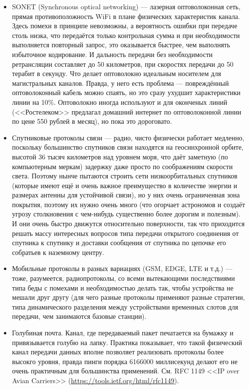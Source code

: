\documentclass[a5paper]{article}
\begin{document}
\begin{itemize}
    \item SONET (Synchronous optical networking) --- лазерная оптоволоконная сеть, прямая противоположность WiFi в плане физических характеристик канала. Здесь помехи в принципе невозможны, а вероятность ошибки при передаче столь низка, что передаётся только контрольная сумма и при необходимости выполняется повторный запрос, это оказывается быстрее, чем выполнять избыточное кодирование. И дальность передачи без необходимости ретрансляции составляет до 50 километров, при скоростях передачи до 50 терабит в секунду. Что делает оптоволокно идеальным носителем для магистральных каналов. Правда, у него есть проблема --- повреждённый оптоволоконный кабель можно спаять, но это сразу ухудшит характеристики линии на 10\%. Оптоволокно иногда используют и для оконченых линий (<<Ростелеком>> предлагал домашний интернет по оптоволоконной линии по цене 550 рублей в месяц), но пока это дороговато.
    \item Спутниковые протоколы связи --- радио, чисто физически работает медленно, поскольку большинство спутников связи находятся на геосинхронной орбите, высотой 36 тысяч километров над уровнем моря, что даёт заметную (по компьютерным меркам) задержку даже просто по соображениям скорости света. Поэтому нынче пытаются строить сети низкоорбитальных спутников (которые имеют ещё и очень важное преимущество в количестве энергии и размерах антенны для устойчивой связи), но у них очень ограниченная зона покрытия, поэтому их нужно очень много (что огорчает астрономов и создаёт угрозу столкновения с чем-нибудь существенно более дорогим и полезным). И они очень быстро движутся относительно поверхности, так что приходится решать массу интересных вопросов типа передачи открытого соединения от спутника к спутнику и доставки сообщения от спутника по цепочке его собратьев к наземному центру.
    \item Мобильные протоколы в разных вариациях (GSM, EDGE, LTE и т.д.) --- тоже, разумеется, радиопротоколы, со всеми вытекающими последствиями типа беды с помехами и необходимостью делать так, чтобы устройства не мешали друг другу (для чего разные протоколы применяют разные стратегии, типа динамического разделения между устройствами временных слотов для передачи, чем занимаются базовые станции).
    \item Голубиная почта. Канал, где передаваемый пакет печатается на бумажку и привязывается голубю на лапку. Практика показывает, что такой физический канал передачи данных вполне позволяет реализовать протоколы более высокго уровня, правда пинги порядка 6166000 миллисекунд делают его не очень практичным для большинства применений. См. RFC 1149 <<IP over Avian Carriers>> (\url{https://tools.ietf.org/html/rfc1149}).
\end{itemize}
\end{document}
